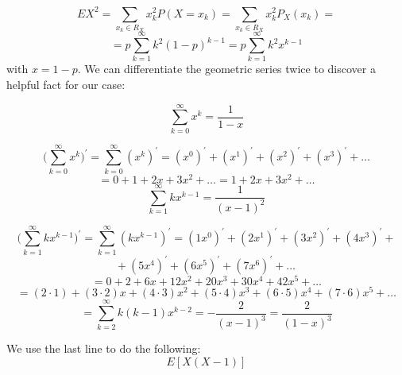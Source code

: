 \documentclass{article}
\begin{document}
\begin{equation*}
    EX^{2} =  \sum_{x_{k} \in R_{X}} x_{k}^{2} P(X = x_{k}) = \sum_{x_{k} \in R_{X}}x_{k}^{2}P_{X}(x_k) =
\end{equation*}
\begin{equation*}
    = p \sum_{k=1}^{\infty} k^{2}(1 - p)^{k-1} = p \sum_{k=1}^{\infty} k^{2}x^{k-1}
\end{equation*}
with \(x = 1 - p\). We can differentiate the geometric series twice to discover a helpful fact for our case:

\begin{equation*}
    \sum_{k=0}^{\infty} x^{k} = \frac{1}{1-x}
\end{equation*}

\begin{equation*}
    \Big(\sum_{k=0}^{\infty} x^{k} \Big)^{'} = \sum_{k=0}^{\infty} (x^{k})^{'} = (x^{0})^{'} + (x^{1})^{'} + (x^{2})^{'} + (x^{3})^{'} + \dots
\end{equation*}
\begin{equation*}
    = 0 + 1 + 2x + 3x^{2} + \dots = 1 + 2x + 3x^{2} + \dots
\end{equation*}
\begin{equation*}
    \sum_{k=1}^{\infty} kx^{k-1} = \frac{1}{(x-1)^{2}}
\end{equation*}

\begin{equation*}
    \Big(\sum_{k=1}^{\infty} kx^{k-1}\Big)^{'} = \sum_{k=1}^{\infty} (kx^{k-1})^{'} = (1x^{0})^{'} + (2x^{1})^{'} + (3x^{2})^{'} + (4x^{3})^{'} + 
\end{equation*}
\begin{equation*}
    + \  (5x^{4})^{'} + (6x^{5})^{'} + (7x^{6})^{'} + \dots
\end{equation*}
\begin{equation*}
    = 0 + 2 + 6x + 12x^{2} + 20x^{3} + 30x^{4} + 42x^{5} + \dots
\end{equation*}
\begin{equation*} 
    = (2 \cdot 1) + (3 \cdot 2)x + (4 \cdot 3)x^{2} + (5 \cdot 4)x^{3} + (6 \cdot 5)x^{4} + (7 \cdot 6)x^{5} + \dots
\end{equation*}
\begin{equation*}
    = \sum_{k=2}^{\infty} k(k-1)x^{k-2} = - \frac{2}{(x-1)^{3}} =  \frac{2}{(1-x)^{3}}
\end{equation*}

We use the last line to do the following:
\begin{equation*}
    E[X(X - 1)]
\end{equation*}
\end{document}
